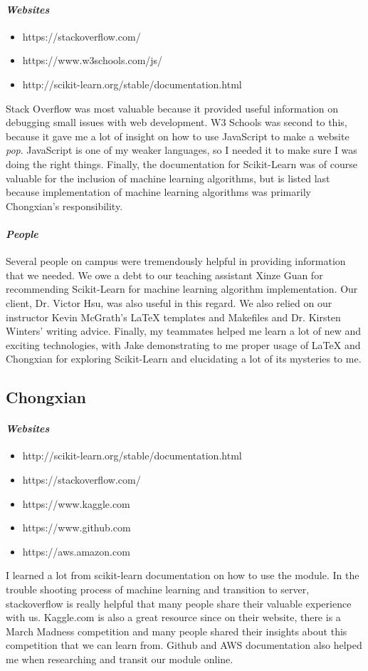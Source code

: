 \documentclass[onecolumn, draftclsnofoot,10pt, compsoc]{IEEEtran}
\begin{document}
\paragraph{\emph{Websites}}
\begin{itemize}
\item https://stackoverflow.com/ 
\item https://www.w3schools.com/js/
\item http://scikit-learn.org/stable/documentation.html
\end{itemize}
Stack Overflow was most valuable because it provided useful information on debugging small issues with web development. W3 Schools was second to this, because it gave me a lot of insight on how to use JavaScript to make a website \emph{pop}. JavaScript is one of my weaker languages, so I needed it to make sure I was doing the right things. Finally, the documentation for Scikit-Learn was of course valuable for the inclusion of machine learning algorithms, but is listed last because implementation of machine learning algorithms was primarily Chongxian's responsibility.
\paragraph{\emph{People}}
Several people on campus were tremendously helpful in providing information that we needed. We owe a debt to our teaching assistant Xinze Guan for recommending Scikit-Learn for machine learning algorithm implementation. Our client, Dr. Victor Hsu, was also useful in this regard. We also relied on our instructor Kevin McGrath's LaTeX templates and Makefiles and Dr. Kirsten Winters' writing advice. Finally, my teammates helped me learn a lot of new and exciting technologies, with Jake demonstrating to me proper usage of LaTeX and Chongxian for exploring Scikit-Learn and elucidating a lot of its mysteries to me. 

\subsection{Chongxian}
\paragraph{\emph{Websites}}
\begin{itemize}
\item http://scikit-learn.org/stable/documentation.html
\item https://stackoverflow.com/ 
\item https://www.kaggle.com
\item https://www.github.com
\item https://aws.amazon.com
\end{itemize}
I learned a lot from scikit-learn documentation on how to use the module. In the trouble shooting process of machine learning and transition to server, stackoverflow is really helpful that many people share their valuable experience with us. Kaggle.com is also a great resource since on their website, there is a March Madness competition and many people shared their insights about this competition that we can learn from. Github and AWS documentation also helped me when researching and transit our module online.
\end{document}
